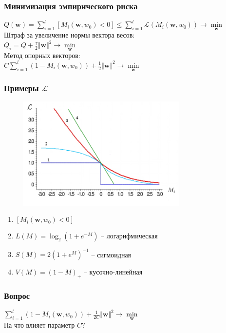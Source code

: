 \documentclass[12pt]{beamer}
\begin{document}
\begin{frame}\frametitle{Минимизация эмпирического риска}
${Q(\mathbf{w}) = \sum\limits_{i=1}^l \left[ M_i(\mathbf{w}, w_0) < 0 \right] \leq\sum\limits_{i=1}^l \mathcal{L}(M_i(\mathbf{w}, w_0)) \rightarrow \min\limits_{\mathbf{w}} }$\\\vspace{3mm}
Штраф за увеличение нормы вектора весов:\\
$Q_{\tau} = Q + \frac{\tau}{2}\Vert \mathbf{w} \Vert^2 \rightarrow \min\limits_{\mathbf{w}}$\\
\vspace{5mm}
Метод опорных векторов:\\
$ C\sum\limits_{i=1}^l (1 - M_i(\mathbf{w}, w_0)) + \frac{1}{2}\Vert \mathbf{w} \Vert^2 \rightarrow \min\limits_{\mathbf{w}}$

\end{frame}

\begin{frame}\frametitle{Примеры $\mathcal{L}$}
\begin{figure}[htbp]
  \includegraphics[height=160pt, keepaspectratio = true]{images/l}
\end{figure}
\begin{enumerate}
\item $\left[M_i(\mathbf{w}, w_0) < 0 \right]$
\item $L(M) = \log_2(1+e^{-M})$ -- логарифмическая
\item $S(M) = 2(1+e^M)^{-1}$ -- сигмоидная
\item $V(M) = (1-M)_+$ -- кусочно-линейная
\end{enumerate}
\end{frame}

\begin{frame}\frametitle{Вопрос}
$ \sum\limits_{i=1}^l (1 - M_i(\mathbf{w}, w_0)) + \frac{1}{2C}\Vert \mathbf{w} \Vert^2 \rightarrow \min\limits_{\mathbf{w}}$\\
\vspace{5mm}
На что влияет параметр $C$?
\end{frame}
\end{document}
